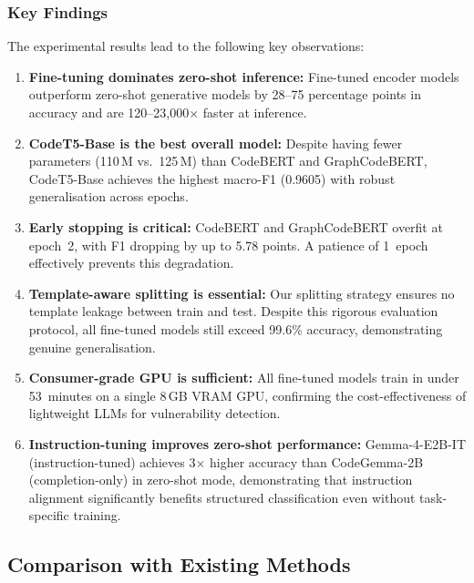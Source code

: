 \subsubsection{Key Findings}
The experimental results lead to the following key observations:
\begin{enumerate}
    \item \textbf{Fine-tuning dominates zero-shot inference:}
          Fine-tuned encoder models outperform zero-shot generative models by
          28--75 percentage points in accuracy and are 120--23,000$\times$
          faster at inference.
    \item \textbf{CodeT5-Base is the best overall model:}
          Despite having fewer parameters (110\,M vs.\ 125\,M) than
          CodeBERT and GraphCodeBERT, CodeT5-Base achieves the highest
          macro-F1 (0.9605) with robust generalisation across epochs.
    \item \textbf{Early stopping is critical:}
          CodeBERT and GraphCodeBERT overfit at epoch~2, with F1 dropping by
          up to 5.78 points.  A patience of 1~epoch effectively prevents
          this degradation.
    \item \textbf{Template-aware splitting is essential:}
          Our splitting strategy ensures no template leakage between train
          and test.  Despite this rigorous evaluation protocol, all
          fine-tuned models still exceed 99.6\% accuracy, demonstrating
          genuine generalisation.
    \item \textbf{Consumer-grade GPU is sufficient:}
          All fine-tuned models train in under 53~minutes on a single 8\,GB
          VRAM GPU, confirming the cost-effectiveness of lightweight LLMs
          for vulnerability detection.
    \item \textbf{Instruction-tuning improves zero-shot performance:}
          Gemma-4-E2B-IT (instruction-tuned) achieves 3$\times$ higher
          accuracy than CodeGemma-2B (completion-only) in zero-shot mode,
          demonstrating that instruction alignment significantly benefits
          structured classification even without task-specific training.
\end{enumerate}

\subsection{Comparison with Existing Methods}
\label{sec:comparison}

